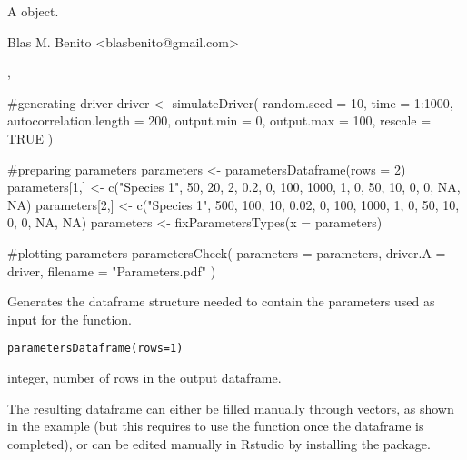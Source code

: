 \documentclass[letterpaper]{book}
\begin{document}
%
\begin{Value}
A  object.
\end{Value}
%
\begin{Author}\relax
Blas M. Benito  <blasbenito@gmail.com>
\end{Author}
%
\begin{SeeAlso}\relax
{}, 
\end{SeeAlso}
%
\begin{Examples}
\begin{ExampleCode}
#generating driver
driver <- simulateDriver(
 random.seed = 10,
 time = 1:1000,
 autocorrelation.length = 200,
 output.min = 0,
 output.max = 100,
 rescale = TRUE
 )

#preparing parameters
parameters <- parametersDataframe(rows = 2)
parameters[1,] <- c("Species 1", 50, 20, 2, 0.2, 0, 100, 1000, 1, 0, 50, 10, 0, 0, NA, NA)
parameters[2,] <- c("Species 1", 500, 100, 10, 0.02, 0, 100, 1000, 1, 0, 50, 10, 0, 0, NA, NA)
parameters <- fixParametersTypes(x = parameters)

#plotting parameters
parametersCheck(
 parameters = parameters,
 driver.A = driver,
 filename = "Parameters.pdf"
 )

\end{ExampleCode}
\end{Examples}
%
\begin{Description}\relax
Generates the dataframe structure needed to contain the parameters used as input for the  function.
\end{Description}
%
\begin{Usage}
\begin{verbatim}
parametersDataframe(rows=1)
\end{verbatim}
\end{Usage}
%
\begin{Arguments}
\begin{ldescription}
\item[\code{rows}] integer, number of rows in the output dataframe.
\end{ldescription}
\end{Arguments}
%
\begin{Details}\relax
The resulting dataframe can either be filled manually through vectors, as shown in the example (but this requires to use the function  once the dataframe is completed), or can be edited manually in Rstudio by installing the  package.
\end{Details}
\end{document}
